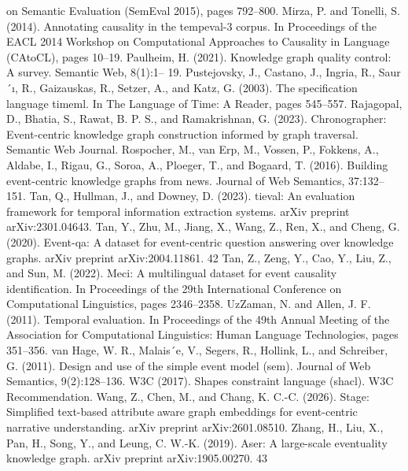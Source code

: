 on Semantic Evaluation (SemEval 2015), pages 792–800.
Mirza, P. and Tonelli, S. (2014). Annotating causality in the tempeval-3 corpus. In
Proceedings of the EACL 2014 Workshop on Computational Approaches to Causality
in Language (CAtoCL), pages 10–19.
Paulheim, H. (2021). Knowledge graph quality control: A survey. Semantic Web, 8(1):1–
19.
Pustejovsky, J., Castano, J., Ingria, R., Saur´ı, R., Gaizauskas, R., Setzer, A., and Katz,
G. (2003). The specification language timeml. In The Language of Time: A Reader,
pages 545–557.
Rajagopal, D., Bhatia, S., Rawat, B. P. S., and Ramakrishnan, G. (2023). Chronographer:
Event-centric knowledge graph construction informed by graph traversal. Semantic
Web Journal.
Rospocher, M., van Erp, M., Vossen, P., Fokkens, A., Aldabe, I., Rigau, G., Soroa, A.,
Ploeger, T., and Bogaard, T. (2016). Building event-centric knowledge graphs from
news. Journal of Web Semantics, 37:132–151.
Tan, Q., Hullman, J., and Downey, D. (2023). tieval: An evaluation framework for
temporal information extraction systems. arXiv preprint arXiv:2301.04643.
Tan, Y., Zhu, M., Jiang, X., Wang, Z., Ren, X., and Cheng, G. (2020). Event-qa: A
dataset for event-centric question answering over knowledge graphs. arXiv preprint
arXiv:2004.11861.
42
Tan, Z., Zeng, Y., Cao, Y., Liu, Z., and Sun, M. (2022). Meci: A multilingual dataset
for event causality identification. In Proceedings of the 29th International Conference
on Computational Linguistics, pages 2346–2358.
UzZaman, N. and Allen, J. F. (2011). Temporal evaluation. In Proceedings of the 49th
Annual Meeting of the Association for Computational Linguistics: Human Language
Technologies, pages 351–356.
van Hage, W. R., Malais´e, V., Segers, R., Hollink, L., and Schreiber, G. (2011). Design
and use of the simple event model (sem). Journal of Web Semantics, 9(2):128–136.
W3C (2017). Shapes constraint language (shacl). W3C Recommendation.
Wang, Z., Chen, M., and Chang, K. C.-C. (2026). Stage: Simplified text-based attributeaware graph embeddings for event-centric narrative understanding. arXiv preprint
arXiv:2601.08510.
Zhang, H., Liu, X., Pan, H., Song, Y., and Leung, C. W.-K. (2019). Aser: A large-scale
eventuality knowledge graph. arXiv preprint arXiv:1905.00270.
43